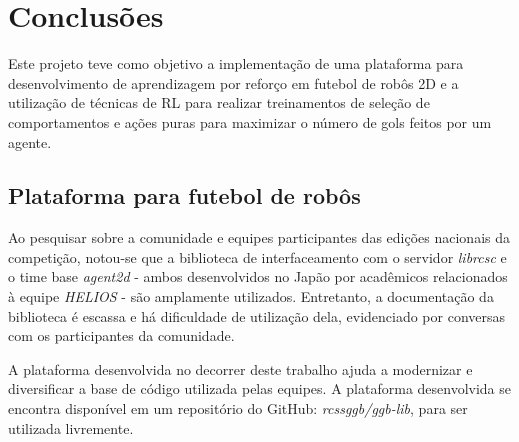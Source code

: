 
\chapter{Conclusões}
\label{chap:Conclusoes}
\par Este projeto teve como objetivo a implementação de uma plataforma para desenvolvimento de aprendizagem por reforço em futebol de robôs 2D e a utilização de técnicas de RL para realizar treinamentos de seleção de comportamentos e ações puras para maximizar o número de gols feitos por um agente.

\section{Plataforma para futebol de robôs}
\par Ao pesquisar sobre a comunidade e equipes participantes das edições nacionais da competição, notou-se que a biblioteca de interfaceamento com o servidor \textit{librcsc} e o time base \textit{agent2d} - ambos desenvolvidos no Japão por acadêmicos relacionados à equipe \textit{HELIOS} - são amplamente utilizados. Entretanto, a documentação da biblioteca é escassa e há dificuldade de utilização dela, evidenciado por conversas com os participantes da comunidade.
\par A plataforma desenvolvida no decorrer deste trabalho ajuda a modernizar e diversificar a base de código utilizada pelas equipes. A plataforma desenvolvida se encontra disponível em um repositório do GitHub: \textit{rcssggb/ggb-lib}, para ser utilizada livremente.



